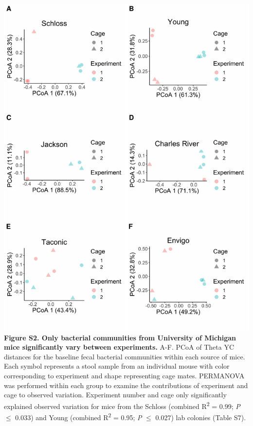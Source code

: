 \documentclass[11pt,]{article}
\begin{document}
\includegraphics{figure_S2.pdf} \textbf{Figure S2. Only bacterial
communities from University of Michigan mice significantly vary between
experiments.} A-F. PCoA of Theta YC distances for the baseline fecal
bacterial communities within each source of mice. Each symbol represents
a stool sample from an individual mouse with color corresponding to
experiment and shape representing cage mates. PERMANOVA was performed
within each group to examine the contributions of experiment and cage to
observed variation. Experiment number and cage only significantly
explained observed variation for mice from the Schloss (combined
R\textsuperscript{2} = 0.99; \emph{P} \(\le\) 0.033) and Young (combined
R\textsuperscript{2} = 0.95; \emph{P} \(\le\) 0.027) lab colonies (Table
S7).

\newpage
\end{document}
